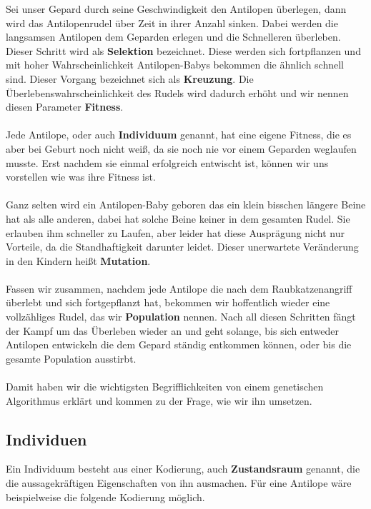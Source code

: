         \noindent
        Sei unser Gepard durch seine Geschwindigkeit den Antilopen überlegen, dann wird das Antilopenrudel über Zeit in ihrer Anzahl sinken. Dabei werden die langsamsen Antilopen dem Geparden erlegen und die Schnelleren überleben. Dieser Schritt wird als \textbf{Selektion} bezeichnet. Diese werden sich fortpflanzen und mit hoher Wahrscheinlichkeit Antilopen-Babys bekommen die ähnlich schnell sind. Dieser Vorgang bezeichnet sich als \textbf{Kreuzung}. Die Überlebenswahrscheinlichkeit des Rudels wird dadurch erhöht und wir nennen diesen Parameter \textbf{Fitness}.\\
        \\
        Jede Antilope, oder auch \textbf{Individuum} genannt, hat eine eigene Fitness, die es aber bei Geburt noch nicht weiß, da sie noch nie vor einem Geparden weglaufen musste. Erst nachdem sie einmal erfolgreich entwischt ist, können wir uns vorstellen wie was ihre Fitness ist.\\
        \\
        Ganz selten wird ein Antilopen-Baby geboren das ein klein bisschen längere Beine hat als alle anderen, dabei hat solche Beine keiner in dem gesamten Rudel. Sie erlauben ihm schneller zu Laufen, aber leider hat diese Ausprägung nicht nur Vorteile, da die Standhaftigkeit darunter leidet. Dieser unerwartete Veränderung in den Kindern heißt \textbf{Mutation}.\\
        \\
        Fassen wir zusammen, nachdem jede Antilope die nach dem Raubkatzenangriff überlebt und sich fortgepflanzt hat, bekommen wir hoffentlich wieder eine vollzähliges Rudel, das wir \textbf{Population} nennen. Nach all diesen Schritten fängt der Kampf um das Überleben wieder an und geht solange, bis sich entweder Antilopen entwickeln die dem Gepard ständig entkommen können, oder bis die gesamte Population ausstirbt.\\
        \\
        Damit haben wir die wichtigsten Begrifflichkeiten von einem genetischen Algorithmus erklärt und kommen zu der Frage, wie wir ihn umsetzen.

        \subsection{Individuen}

            Ein Individuum besteht aus einer Kodierung, auch \textbf{Zustandsraum} genannt, die die aussagekräftigen Eigenschaften von ihn ausmachen. Für eine Antilope wäre beispielweise die folgende Kodierung möglich.

